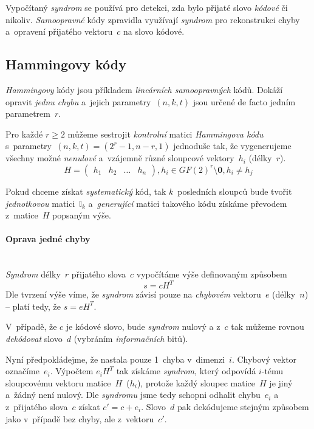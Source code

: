 \documentclass[thesis=M,czech,hidelinks]{FITthesis}[2012/06/26]
\newcommand{\0}{{\textcolor[gray]{0.75}{0}}}
\begin{document}
Vypočítaný \emph{syndrom} se používá pro detekci, zda bylo přijaté slovo
\emph{kódové} či nikoliv. \emph{Samoopravné} kódy zpravidla využívají
\emph{syndrom} pro rekonstrukci chyby a~opravení přijatého vektoru~$c$ na slovo
kódové.

\subsection{Hammingovy kódy}\label{kap_hammingovy_kody}

\emph{Hammingovy} kódy jsou příkladem \emph{lineárních samoopravných} kódů.
Dokáží opravit \emph{jednu chybu} a~jejich parametry~$(n,k,t)$ jsou určené de
facto jedním parametrem~$r$.

Pro každé $r \geq 2$ můžeme sestrojit \emph{kontrolní} matici \emph{Hammingova
kódu} s~parametry~$(n,k,t) = (2^r-1,n-r,1)$ jednoduše tak, že vygenerujeme
všechny možné \emph{nenulové} a~vzájemně různé sloupcové vektory~$h_i$
(délky~$r$).
$$
    H = \left(
    \begin{array}{*{4}{c}}
        h_1 & h_2 & \ldots & h_n
    \end{array}
    \right), h_i \in GF(2)^r \setminus \textbf{0}, h_i \neq h_j
$$

Pokud chceme získat \emph{systematický} kód, tak $k$~posledních sloupců bude
tvořit \emph{jednotkovou} matici~$\mathbb{I}_k$ a~\emph{generující} matici
takového kódu získáme převodem z~matice~$H$ popsaným výše.

\paragraph{Oprava jedné chyby} \hfill \\
\emph{Syndrom} délky~$r$ přijatého slova~$c$ vypočítáme výše definovaným
způsobem
$$ s = cH^T $$
Dle tvrzení výše víme, že \emph{syndrom} závisí pouze na \emph{chybovém}
vektoru~$e$ (délky~$n$) -- platí tedy, že $s = e H^T$.

V~případě, že $c$ je kódové slovo, bude \emph{syndrom} nulový a z~$c$ tak můžeme
rovnou \emph{dekódovat} slovo~$d$ (vybráním \emph{informačních} bitů).

Nyní předpokládejme, že nastala pouze 1~chyba v~dimenzi~$i$. Chybový vektor
označíme~$e_i$. Výpočtem $e_i H^T$ tak získáme \emph{syndrom}, který odpovídá
$i$-tému sloupcovému vektoru matice~$H$~($h_i$), protože každý sloupec
matice~$H$ je jiný a~žádný není nulový. Dle \emph{syndromu} jsme tedy schopni
odhalit chybu~$e_i$ a z~přijatého slova~$c$ získat $c' = c + e_i$. Slovo~$d$ pak
dekódujeme stejným způsobem jako v~případě bez chyby, ale z~vektoru~$c'$.
\end{document}
